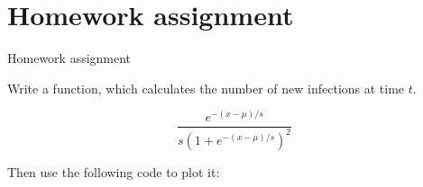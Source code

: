 \section{Homework assignment}


\begin{frame}[fragile]{Homework assignment}

    Write a function, which calculates the number of new infections at time $t$.

    \[
        \frac{e^{-(x-\mu)/s}} {s\left(1+e^{-(x-\mu)/s}\right)^2}
    \]

    Then use the following code to plot it:
\end{frame}


